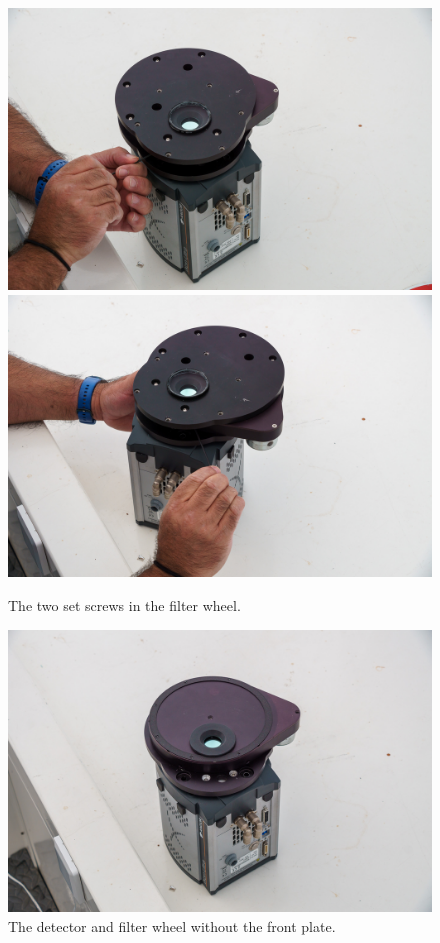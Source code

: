 \begin{figure}
\begin{center}
\includegraphics[width=0.8\linewidth]{figures/huitzi-set-screws-a.jpg}
\includegraphics[width=0.8\linewidth]{figures/huitzi-set-screws-b.jpg}
\end{center}
\caption{The two set screws in the filter wheel.}
\label{figure:huitzi-set-screws}
\end{figure}


\begin{figure}
\begin{center}
\includegraphics[width=0.8\linewidth]{figures/huitzi-without-front-plate.jpg}
\end{center}
\caption{The detector and filter wheel without the front plate.}
\label{figure:huitzi-without-front-plate}
\end{figure}

